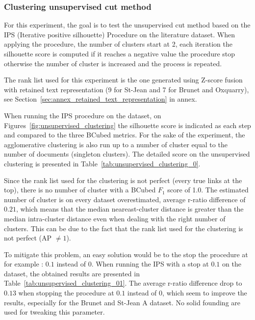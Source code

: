 \subsubsection{Clustering unsupervised cut method}

For this experiment, the goal is to test the unsupervised cut method based on the IPS (Iterative positive silhouette) Procedure on the literature dataset.
When applying the procedure, the number of clusters start at 2, each iteration the silhouette score is computed if it reaches a negative value the procedure stop otherwise the number of cluster is increased and the process is repeated.

The rank list used for this experiment is the one generated using Z-score fusion with retained text representation (9 for St-Jean and 7 for Brunet and Oxquarry), see Section~\ref{sec:annex_retained_text_representation} in annex.

When running the IPS procedure on the dataset, on Figures~\ref{fig:unsupervised_clustering} the silhouette score is indicated as each step and compared to the three BCubed metrics.
For the sake of the experiment, the agglomerative clustering is also run up to a number of cluster equal to the number of documents (singleton clusters).
The detailed score on the unsupervised clustering is presented in Table~\ref{tab:unsupervised_clustering_0}.

Since the rank list used for the clustering is not perfect (every true links at the top), there is no number of cluster with a BCubed $F_1$ score of 1.0.
The estimated number of cluster is on every dataset overestimated, average r-ratio difference of $0.21$, which means that the median neareast-cluster distance is greater than the median intra-cluster distance even when dealing with the right number of clusters.
This can be due to the fact that the rank list used for the clustering is not perfect (AP $\neq 1$).

To mitigate this problem, an easy solution would be to the stop the procedure at for example : $0.1$ instead of $0$.
When running the IPS with a stop at $0.1$ on the dataset, the obtained results are presented in Table~\ref{tab:unsupervised_clustering_01}.
The average r-ratio difference drop to $0.13$ when stopping the procedure at $0.1$ instead of $0$, which seem to improve the results, especially for the Brunet and St-Jean A dataset.
No solid founding are used for tweaking this parameter.


